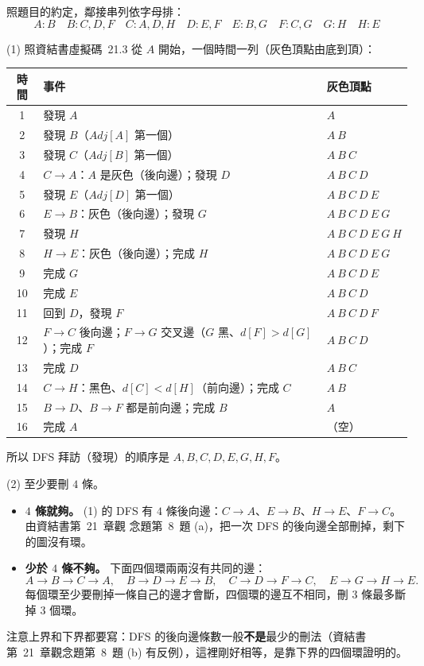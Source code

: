 \begin{pastsoln}
照題目的約定，鄰接串列依字母排：
\[
A\colon B \quad B\colon C, D, F \quad C\colon A, D, H \quad D\colon E, F \quad
E\colon B, G \quad F\colon C, G \quad G\colon H \quad H\colon E
\]

(1) 照資結書虛擬碼~21.3 從 $A$ 開始，一個時間一列（灰色頂點由底到頂）：

\begin{center}
\small
\begin{tabular}{cll}
\toprule
時間 & 事件 & 灰色頂點 \\
\midrule
1 & 發現 $A$ & $A$ \\
2 & 發現 $B$（$\mathit{Adj}[A]$ 第一個） & $A\ B$ \\
3 & 發現 $C$（$\mathit{Adj}[B]$ 第一個） & $A\ B\ C$ \\
4 & $C \to A$：$A$ 是灰色（後向邊）；發現 $D$ & $A\ B\ C\ D$ \\
5 & 發現 $E$（$\mathit{Adj}[D]$ 第一個） & $A\ B\ C\ D\ E$ \\
6 & $E \to B$：灰色（後向邊）；發現 $G$ & $A\ B\ C\ D\ E\ G$ \\
7 & 發現 $H$ & $A\ B\ C\ D\ E\ G\ H$ \\
8 & $H \to E$：灰色（後向邊）；完成 $H$ & $A\ B\ C\ D\ E\ G$ \\
9 & 完成 $G$ & $A\ B\ C\ D\ E$ \\
10 & 完成 $E$ & $A\ B\ C\ D$ \\
11 & 回到 $D$，發現 $F$ & $A\ B\ C\ D\ F$ \\
12 & $F \to C$ 後向邊；$F \to G$ 交叉邊（$G$ 黑、$d[F] > d[G]$）；完成 $F$ & $A\ B\ C\ D$ \\
13 & 完成 $D$ & $A\ B\ C$ \\
14 & $C \to H$：黑色、$d[C] < d[H]$（前向邊）；完成 $C$ & $A\ B$ \\
15 & $B \to D$、$B \to F$ 都是前向邊；完成 $B$ & $A$ \\
16 & 完成 $A$ & （空） \\
\bottomrule
\end{tabular}
\end{center}

所以 DFS 拜訪（發現）的順序是 $A, B, C, D, E, G, H, F$。

(2) 至少要刪 $4$ 條。
\begin{itemize}
\item \textbf{$4$ 條就夠。} (1) 的 DFS 有 $4$ 條後向邊：$C \to A$、$E \to B$、$H \to E$、$F \to C$。 由資結書第~21~章觀
念題第~8~題 (a)，把一次 DFS 的後向邊全部刪掉，剩下的圖沒有環。
\item \textbf{少於 $4$ 條不夠。} 下面四個環兩兩沒有共同的邊：
\[
A \to B \to C \to A,\quad B \to D \to E \to B,\quad C \to D \to F \to C,\quad E \to G \to H \to E.
\]
每個環至少要刪掉一條自己的邊才會斷，四個環的邊互不相同，刪 $3$ 條最多斷掉 $3$ 個環。
\end{itemize}
注意上界和下界都要寫：DFS 的後向邊條數一般\textbf{不是}最少的刪法（資結書第~21~章觀念題第~8~題
(b) 有反例），這裡剛好相等，是靠下界的四個環證明的。 


\end{pastsoln}
